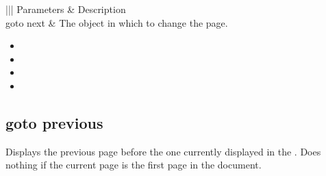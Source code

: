 \documentclass[letterpaper,12pt,english,openany,oneside]{sphinxmanual}
\begin{document}
\begin{savenotes}\sphinxattablestart
\centering
{}\label{\detokenize{IAC_API_AppleEvtObjects:section-41}}\nobreak
\begin{tabular}[t]{|||}
\hline
\sphinxstyletheadfamily 
Parameters
&\sphinxstyletheadfamily 
Description
\\
\hline
goto next
&
The  object in which to change the page.
\\
\hline
\end{tabular}
\par
\sphinxattableend\end{savenotes}
\label{\detokenize{IAC_API_AppleEvtObjects:related-events-16}}
\begin{itemize}
\item {} 

\item {} 

\item {} 

\item {} 

\end{itemize}
\label{\detokenize{IAC_API_AppleEvtObjects:applescript-example-22}}

\begin{sphinxVerbatim}[commandchars=\\\{\}]
    
\end{sphinxVerbatim}
\label{\detokenize{IAC_API_AppleEvtObjects:apple-event-id-13}}

\begin{sphinxVerbatim}[commandchars=\\\{\}]
 
\end{sphinxVerbatim}




\subsection{goto previous}
\label{\detokenize{IAC_API_AppleEvtObjects:goto-previous}}
Displays the previous page before the one currently displayed in the  . Does nothing if the current page is the first page in the document.
\end{document}
